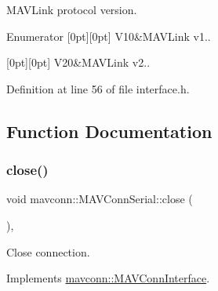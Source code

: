M\+A\+V\+Link protocol version. 

\begin{DoxyEnumFields}{Enumerator}
[0pt][0pt]{}\mbox{\label{group__mavconn_ggae4e5498ebfd232dcad75be0f8a168ff3a3ffc64fa10df9a884ba82f3e49e8282e}} 
V10&M\+A\+V\+Link v1.. \\
\hline

[0pt][0pt]{}\mbox{\label{group__mavconn_ggae4e5498ebfd232dcad75be0f8a168ff3aba9161e2ae9f747e361fa824ca0d0337}} 
V20&M\+A\+V\+Link v2.. \\
\hline

\end{DoxyEnumFields}


Definition at line 56 of file interface.\+h.



\subsection{Function Documentation}
\mbox{\label{group__mavconn_gabacc69adc5d2d2f9cb3aa27907d83d5c}} 
\subsubsection{\texorpdfstring{close()}{close()}\hspace{0.1cm}{\footnotesize\ttfamily [1/5]}}
{\footnotesize\ttfamily void mavconn\+::\+M\+A\+V\+Conn\+Serial\+::close (\begin{DoxyParamCaption}{ }\end{DoxyParamCaption})\hspace{0.3cm}{\ttfamily [override]}, {\ttfamily [virtual]}}



Close connection. 



Implements \mbox{\hyperlink{group__mavconn_ga7c1a5a89489e345a6621c327107293d8}{mavconn\+::\+M\+A\+V\+Conn\+Interface}}.



